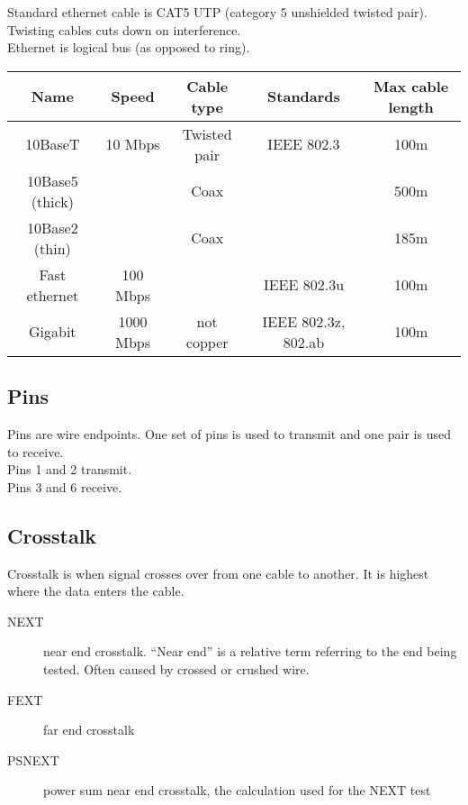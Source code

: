 Standard ethernet cable is CAT5 UTP (category 5 unshielded twisted pair).
Twisting cables cuts down on interference.\\

Ethernet is logical bus (as opposed to ring).\\

\begin{tabular}{ | c | c | c | c | c | }
\hline
Name & Speed & Cable type & Standards & Max cable length \\ \hline
10BaseT & 10 Mbps & Twisted pair & IEEE 802.3 & 100m \\ \hline
10Base5 (thick) & & Coax & & 500m \\ \hline
10Base2 (thin) & & Coax & & 185m \\ \hline
Fast ethernet & 100 Mbps & & IEEE 802.3u & 100m \\ \hline
Gigabit & 1000 Mbps & not copper & IEEE 802.3z, 802.ab & 100m \\ \hline
\end{tabular}

\subsection{Pins}

Pins are wire endpoints. One set of pins is used to transmit and one pair
is used to receive.\\

Pins 1 and 2 transmit.\\

Pins 3 and 6 receive.

\subsection{Crosstalk}

Crosstalk is when signal crosses over from one cable to another. It is highest
where the data enters the cable.

\begin{description}

\item[NEXT]
near end crosstalk. ``Near end'' is a relative term referring to the end being
tested. Often caused by crossed or crushed wire.

\item[FEXT]
far end crosstalk

\item[PSNEXT]
power sum near end crosstalk, the calculation used for the NEXT test

\end{description}


